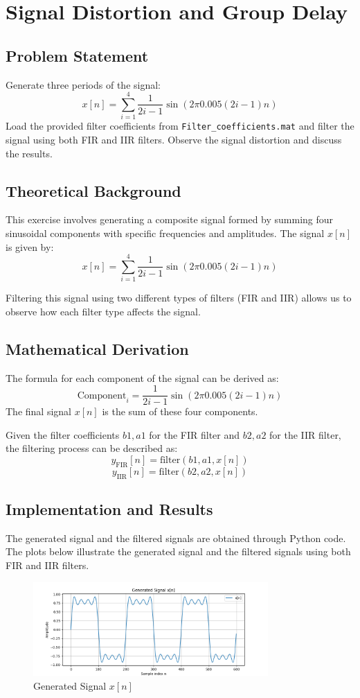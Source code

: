 \section*{Signal Distortion and Group Delay}

\subsection*{Problem Statement}
Generate three periods of the signal:
\[ x[n]=\sum_{i=1}^{4} \frac{1}{2 i-1} \sin (2 \pi 0.005(2 i-1) n) \]
Load the provided filter coefficients from \texttt{Filter\_coefficients.mat} and filter the signal using both FIR and IIR filters. Observe the signal distortion and discuss the results.

\subsection*{Theoretical Background}
This exercise involves generating a composite signal formed by summing four sinusoidal components with specific frequencies and amplitudes. The signal \( x[n] \) is given by:
\[ x[n]=\sum_{i=1}^{4} \frac{1}{2 i-1} \sin (2 \pi 0.005(2 i-1) n) \]

Filtering this signal using two different types of filters (FIR and IIR) allows us to observe how each filter type affects the signal.

\subsection*{Mathematical Derivation}
The formula for each component of the signal can be derived as:
\[ \text{Component}_i = \frac{1}{2i-1} \sin(2 \pi 0.005 (2i-1) n) \]
The final signal \( x[n] \) is the sum of these four components.

Given the filter coefficients \( b1, a1 \) for the FIR filter and \( b2, a2 \) for the IIR filter, the filtering process can be described as:
\[ y_{\text{FIR}}[n] = \text{filter}(b1, a1, x[n]) \]
\[ y_{\text{IIR}}[n] = \text{filter}(b2, a2, x[n]) \]

\subsection*{Implementation and Results}
The generated signal and the filtered signals are obtained through Python code. The plots below illustrate the generated signal and the filtered signals using both FIR and IIR filters.

\begin{figure}[h]
    \centering
    \includegraphics[width=0.8\textwidth]{fig/ex1_generated_signal.png}
    \caption{Generated Signal \( x[n] \)}
    \label{fig:ex1_generated_signal}
\end{figure}

